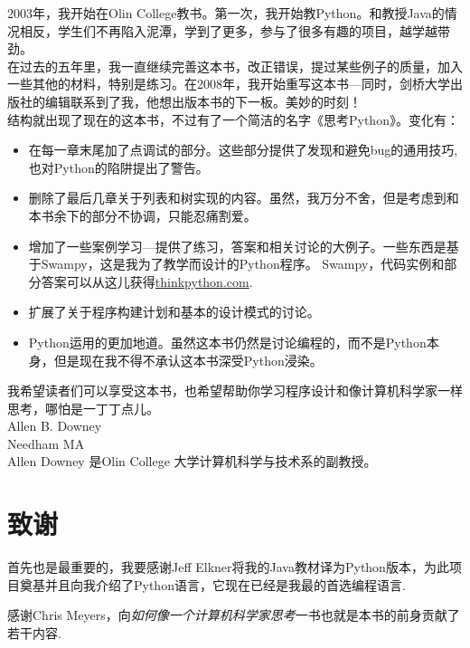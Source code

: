  2003年，我开始在Olin College教书。第一次，我开始教Python。和教授Java的情况相反，学生们不再陷入泥潭，学到了更多，参与了很多有趣的项目，越学越带劲。\\

 在过去的五年里，我一直继续完善这本书，改正错误，提过某些例子的质量，加入一些其他的材料，特别是练习。在2008年，我开始重写这本书---同时，剑桥大学出版社的编辑联系到了我，他想出版本书的下一板。美妙的时刻！\\

 结构就出现了现在的这本书，不过有了一个简洁的名字《思考Python》。变化有：
 \begin{itemize}

 \item 在每一章末尾加了点调试的部分。这些部分提供了发现和避免bug的通用技巧,也对Python的陷阱提出了警告。

 \item 删除了最后几章关于列表和树实现的内容。虽然，我万分不舍，但是考虑到和本书余下的部分不协调，只能忍痛割爱。

 \item 增加了一些案例学习---提供了练习，答案和相关讨论的大例子。一些东西是基于Swampy，这是我为了教学而设计的Python程序。
 Swampy，代码实例和部分答案可以从这儿获得\url{thinkpython.com}.

 \item 扩展了关于程序构建计划和基本的设计模式的讨论。

 \item Python运用的更加地道。虽然这本书仍然是讨论编程的，而不是Python本身，但是现在我不得不承认这本书深受Python浸染。
 
 \end{itemize}

  我希望读者们可以享受这本书，也希望帮助你学习程序设计和像计算机科学家一样思考，哪怕是一丁丁点儿。\\

Allen B. Downey\\
Needham MA\\

Allen Downey 是Olin College 大学计算机科学与技术系的副教授。



\section*{致谢}
首先也是最重要的，我要感谢Jeff Elkner将我的Java教材译为Python版本，为此项目奠基并且向我介绍了Python语言，它现在已经是我最的首选编程语言.

感谢Chris Meyers，向{\em 如何像一个计算机科学家思考}一书也就是本书的前身贡献了若干内容.


